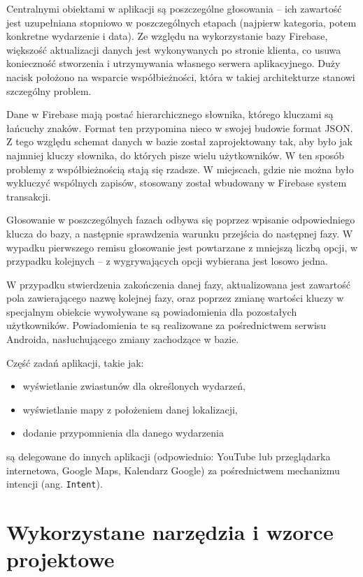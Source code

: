 \documentclass[10pt,a4paper]{article}
\begin{document}
Centralnymi obiektami w aplikacji są poszczególne głosowania -- ich zawartość jest uzupełniana
stopniowo w poszczególnych etapach (najpierw kategoria, potem konkretne wydarzenie i data).
Ze względu na wykorzystanie bazy Firebase, większość aktualizacji danych jest wykonywanych po stronie
klienta, co usuwa konieczność stworzenia i utrzymywania własnego serwera aplikacyjnego.
Duży nacisk położono na wsparcie współbieżności, która w takiej architekturze stanowi szczególny
problem.

Dane w Firebase mają postać hierarchicznego słownika, którego kluczami są łańcuchy znaków.
Format ten przypomina nieco w swojej budowie format JSON.
Z tego względu schemat danych w bazie został zaprojektowany tak, aby było jak najmniej kluczy
słownika, do których pisze wielu użytkowników.
W ten sposób problemy z współbieżnością stają się rzadsze.
W miejscach, gdzie nie można było wykluczyć wspólnych zapisów, stosowany został wbudowany w Firebase
system transakcji.

Głosowanie w poszczególnych fazach odbywa się poprzez wpisanie odpowiedniego klucza do bazy,
a następnie sprawdzenia warunku przejścia do następnej fazy.
W wypadku pierwszego remisu głosowanie jest powtarzane z mniejszą liczbą opcji, w przypadku
kolejnych -- z wygrywających opcji wybierana jest losowo jedna.

W przypadku stwierdzenia zakończenia danej fazy, aktualizowana jest zawartość pola zawierającego
nazwę kolejnej fazy, oraz poprzez zmianę wartości kluczy w specjalnym obiekcie wywoływane są
powiadomienia dla pozostałych użytkowników. Powiadomienia te są realizowane za pośrednictwem
serwisu Androida, nasłuchującego zmiany zachodzące w bazie.

Część zadań aplikacji, takie jak:
\begin{itemize}
	\item wyświetlanie zwiastunów dla określonych wydarzeń,
	\item wyświetlanie mapy z położeniem danej lokalizacji,
	\item dodanie przypomnienia dla danego wydarzenia
\end{itemize}
są delegowane do innych aplikacji (odpowiednio: YouTube lub przeglądarka internetowa, Google Maps, 
Kalendarz Google) za pośrednictwem mechanizmu intencji (ang. \texttt{Intent}).

\section{Wykorzystane narzędzia i wzorce projektowe}
\end{document}
